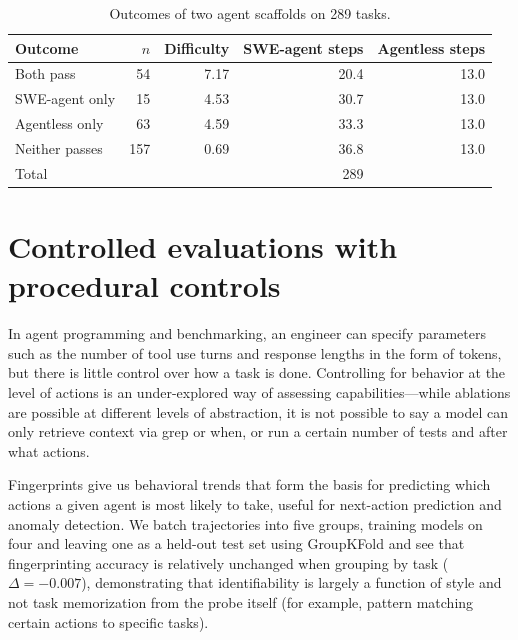 \documentclass[11pt]{article}
\begin{document}
  \begin{table}[H]
  \centering\small
  \begin{tabular}{lrrrr}
  \toprule
  \textbf{Outcome} & \textbf{$n$} & \textbf{Difficulty} & \textbf{SWE-agent steps} & \textbf{Agentless steps} \\
  \midrule
  Both pass       &  54 & 7.17 & 20.4 & 13.0 \\
  SWE-agent only  &  15 & 4.53 & 30.7 & 13.0 \\
  Agentless only  &  63 & 4.59 & 33.3 & 13.0 \\
  Neither passes  & 157 & 0.69 & 36.8 & 13.0 \\
  \midrule
  \multicolumn{2}{l}{Total} & & 289 \\
  \bottomrule
  \end{tabular}
  \caption{Outcomes of two agent scaffolds on 289 tasks.}
  \label{tab:scaffold_outcomes}
  \end{table}

  \section{Controlled evaluations with procedural controls}
  In agent programming and benchmarking, an engineer can specify parameters such as the number of tool use turns and
  response lengths in the form of tokens, but there is little control over how a task is done. Controlling for behavior at
  the level of actions is an under-explored way of assessing capabilities---while ablations are possible at different
  levels of abstraction, it is not possible to say a model can only retrieve context via grep or when, or run a certain
  number of tests and after what actions.

  Fingerprints give us behavioral trends that form the basis for predicting which actions a given agent is most likely to
  take, useful for next-action prediction and anomaly detection. We batch trajectories into five groups, training models on
  four and leaving one as a held-out test set using GroupKFold and see that fingerprinting accuracy is relatively
  unchanged when grouping by task ($\Delta = -0.007$), demonstrating that identifiability is largely a function of style
  and not task memorization from the probe itself (for example, pattern matching certain actions to specific tasks).
\end{document}
